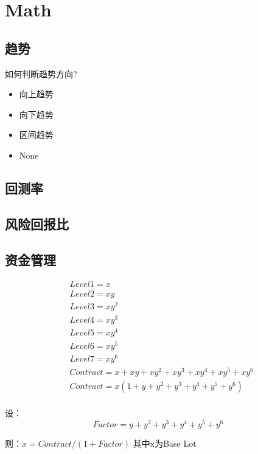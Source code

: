 \chapter{Math}

\section{趋势}

如何判断趋势方向?

\begin{itemize}
\item 向上趋势
\item 向下趋势
\item 区间趋势
\item None
\end{itemize}

\section{回测率}


\section{风险回报比}

\section{资金管理}

\begin{align*}
& Level1=x \\
& Level2=xy \\
& Level3=xy^2 \\
& Level4=xy^3 \\
& Level5=xy^4 \\
& Level6=xy^5 \\
& Level7=xy^6 \\
& Contract = x + xy + xy^2  + xy^3  + xy^4  + xy^5  + xy^6\\
& Contract = x(1+y+y^2+y^3+y^4+y^5+y^6) \\
\end{align*}

设：$$Factor = y+y^2+y^3+y^4+y^5+y^6$$

则：$x=Contract/(1+Factor)$ 其中x为Base Lot















